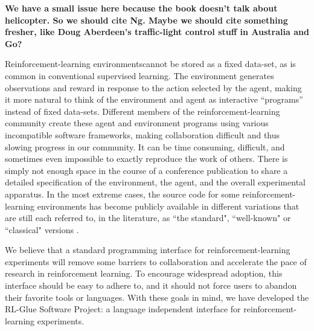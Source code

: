 \documentclass[twoside,11pt]{article}
\begin{document}
\textbf{We have a small issue here because the book doesn't talk about helicopter.  So we should cite Ng. Maybe we should cite something fresher, like Doug Aberdeen's traffic-light control stuff in Australia and Go?}


Reinforcement-learning environmentscannot be stored as a fixed data-set, as is common in conventional supervised learning.  The environment generates observations and reward in response to the action selected by the agent, making it more natural to think of the environment and agent as interactive ``programs'' instead of fixed data-sets.  Different members of the reinforcement-learning community create these agent and environment programs using various incompatible software frameworks, making collaboration difficult and thus slowing progress in our community. It  can be time consuming, difficult, and sometimes even impossible to exactly reproduce the work of others.  There is simply not enough space in the course of a conference publication to share a detailed specification of the environment, the agent, and the overall experimental apparatus.
In the most extreme cases, the source code for some reinforcement-learning environments has become publicly available in different variations that are still each referred to, in the literature, as ``the standard", ``well-known" or ``classical"  versions \citep{whiteThesis}.

We believe that a standard programming interface for reinforcement-learning experiments will remove some barriers to collaboration and accelerate the pace of research in reinforcement learning.  To encourage widespread adoption, this interface should be easy to adhere to, and it should not force users to abandon their favorite tools or languages.  With these goals in mind, we have developed the RL-Glue Software Project: a language independent interface for reinforcement-learning experiments.

 
\end{document}
